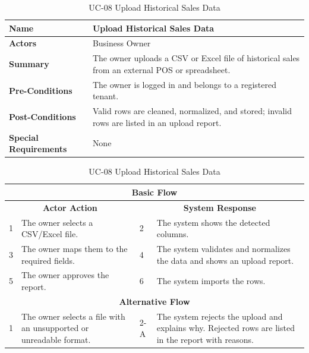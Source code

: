 \documentclass{StockSense}
\begin{document}
\begin{table}[!htbp]
\centering
\caption{UC-08 Upload Historical Sales Data}
{\small\linespread{1}\selectfont
\begin{tabular}{|p{}|p{}|}
\hline
\textbf{Name} & Upload Historical Sales Data \\ \hline
\textbf{Actors} & Business Owner \\ \hline
\textbf{Summary} & The owner uploads a CSV or Excel file of historical sales from an external POS or spreadsheet. \\ \hline
\textbf{Pre-Conditions} & The owner is logged in and belongs to a registered tenant. \\ \hline
\textbf{Post-Conditions} & Valid rows are cleaned, normalized, and stored; invalid rows are listed in an upload report. \\ \hline
\textbf{Special Requirements} & None \\ \hline
\end{tabular}\par\nointerlineskip
\begin{tabular}{|p{}|p{}|p{}|p{}|}
\multicolumn{4}{|c|}{\textbf{Basic Flow}} \\ \hline
\multicolumn{2}{|c|}{\textbf{Actor Action}} & \multicolumn{2}{c|}{\textbf{System Response}} \\ \hline
1 & The owner selects a CSV/Excel file. & 2 & The system shows the detected columns. \\ \hline
3 & The owner maps them to the required fields. & 4 & The system validates and normalizes the data and shows an upload report. \\ \hline
5 & The owner approves the report. & 6 & The system imports the rows. \\ \hline
\multicolumn{4}{|c|}{\textbf{Alternative Flow}} \\ \hline
1 & The owner selects a file with an unsupported or unreadable format. & 2-A & The system rejects the upload and explains why. Rejected rows are listed in the report with reasons. \\ \hline
\end{tabular}\par}
\end{table}
\end{document}
